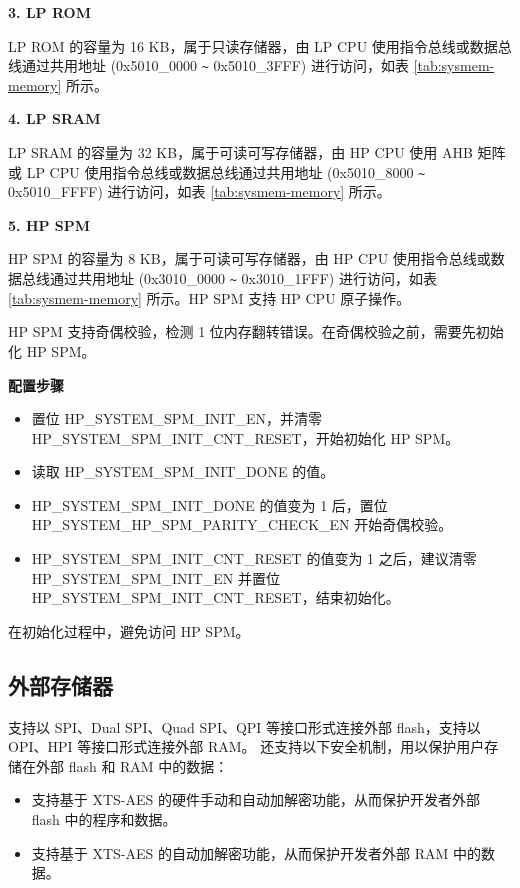 \documentclass[main\_\_CN.tex]{subfiles}
\begin{document}
{\bfseries 3. LP ROM}

LP ROM 的容量为 16 KB，属于只读存储器，由 LP CPU 使用指令总线或数据总线通过共用地址 (0x5010\_0000 \verb+~+ 0x5010\_3FFF) 进行访问，如表  \ref{tab:sysmem-memory} 所示。

{\bfseries 4. LP SRAM}

LP SRAM 的容量为 32 KB，属于可读可写存储器，由 HP CPU 使用 AHB 矩阵或 LP CPU 使用指令总线或数据总线通过共用地址 (0x5010\_8000 \verb+~+ 0x5010\_FFFF) 进行访问，如表  \ref{tab:sysmem-memory} 所示。

{\bfseries 5. HP SPM}

HP SPM 的容量为 8 KB，属于可读可写存储器，由 HP CPU 使用指令总线或数据总线通过共用地址 (0x3010\_0000 \verb+~+ 0x3010\_1FFF) 进行访问，如表  \ref{tab:sysmem-memory} 所示。HP SPM 支持 HP CPU 原子操作。

HP SPM 支持奇偶校验，检测 1 位内存翻转错误。在奇偶校验之前，需要先初始化 HP SPM。

\textbf{配置步骤}
\begin{itemize}
    \item 置位 HP\_SYSTEM\_SPM\_INIT\_EN，并清零 HP\_SYSTEM\_SPM\_INIT\_CNT\_RESET，开始初始化 HP SPM。
    \item 读取 HP\_SYSTEM\_SPM\_INIT\_DONE 的值。
    \item HP\_SYSTEM\_SPM\_INIT\_DONE 的值变为 1 后，置位 HP\_SYSTEM\_HP\_SPM\_PARITY\_CHECK\_EN 开始奇偶校验。
    \item HP\_SYSTEM\_SPM\_INIT\_CNT\_RESET 的值变为 1 之后，建议清零 HP\_SYSTEM\_SPM\_INIT\_EN 并置位 HP\_SYSTEM\_SPM\_INIT\_CNT\_RESET，结束初始化。
\end{itemize}
在初始化过程中，避免访问 HP SPM。

\subsection{ 外部存储器}
\label{para:sysmem-external-memory}

\chipname{} 支持以 SPI、Dual SPI、Quad SPI、QPI 等接口形式连接外部 flash，支持以 OPI、HPI 等接口形式连接外部 RAM。\chipname{} 还支持以下安全机制，用以保护用户存储在外部 flash 和 RAM 中的数据：
\begin{itemize}
    \item 支持基于 XTS-AES 的硬件手动和自动加解密功能，从而保护开发者外部 flash 中的程序和数据。
    \item 支持基于 XTS-AES 的自动加解密功能，从而保护开发者外部 RAM 中的数据。
\end{itemize}
\end{document}
